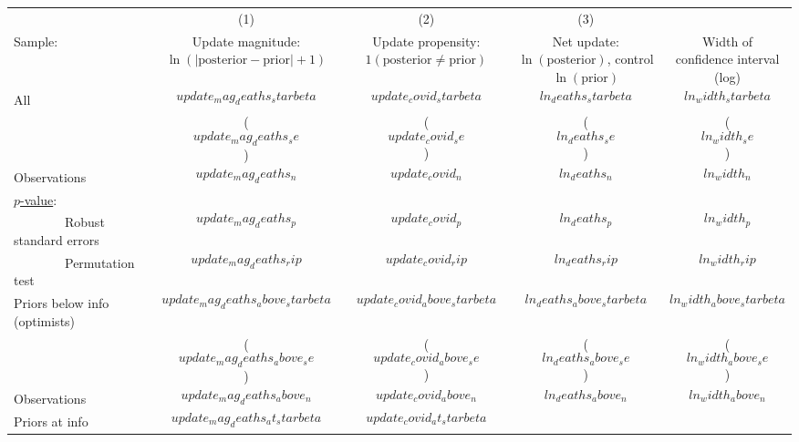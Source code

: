 \begin{tabular}{l c c c c}
  \hline
  \hline
 & (1) & (2) & (3) \\ 
  Sample: & \shortstack{Update magnitude: \\ $\ln(|\text{posterior} -
  \text{prior}|+1)$} & \shortstack{Update propensity: \\ $1(\text{posterior}
  \neq \text{prior})$} & \shortstack{Net update: \\
  $\ln(\text{posterior})$, \\ control $\ln(\text{prior})$ } &
                                                              \shortstack{Width
                                                              of \\
  confidence interval \\ (log)} \\
  \hline  
All & $$update_mag_deaths_starbeta$$ & $$update_covid_starbeta$$
             & $$ln_deaths_starbeta$$ & $$ln_width_starbeta$$ \\
& ($$update_mag_deaths_se$$) & ($$update_covid_se$$) &
                                                       ($$ln_deaths_se$$)
                   & ($$ln_width_se$$) \\
Observations & $$update_mag_deaths_n$$ & $$update_covid_n$$
             & $$ln_deaths_n$$ & $$ln_width_n$$ \\
\multicolumn{1}{l}{ \underline{$p$-value}:} \\  
\multicolumn{1}{l}{ \ \ \ \ \ \ \ \ Robust standard errors}
  & $$update_mag_deaths_p$$ & $$update_covid_p$$ & $$ln_deaths_p$$
                   & $$ln_width_p$$ \\
\multicolumn{1}{l}{ \ \ \ \ \ \ \ \ Permutation test}
  & $$update_mag_deaths_rip$$ & $$update_covid_rip$$
             & $$ln_deaths_rip$$ & $$ln_width_rip$$ \\
  \hline 
Priors below info (optimists) & $$update_mag_deaths_above_starbeta$$ & $$update_covid_above_starbeta$$
       & $$ln_deaths_above_starbeta$$ & $$ln_width_above_starbeta$$ \\
  & ($$update_mag_deaths_above_se$$) & ($$update_covid_above_se$$) &
                                                                     ($$ln_deaths_above_se$$)
                   & ($$ln_width_above_se$$) \\
Observations & $$update_mag_deaths_above_n$$
       & $$update_covid_above_n$$ & $$ln_deaths_above_n$$
                   & $$ln_width_above_n$$ \\
  \hline
Priors at info & $$update_mag_deaths_at_starbeta$$ & $$update_covid_at_starbeta$$

\end{tabular}
